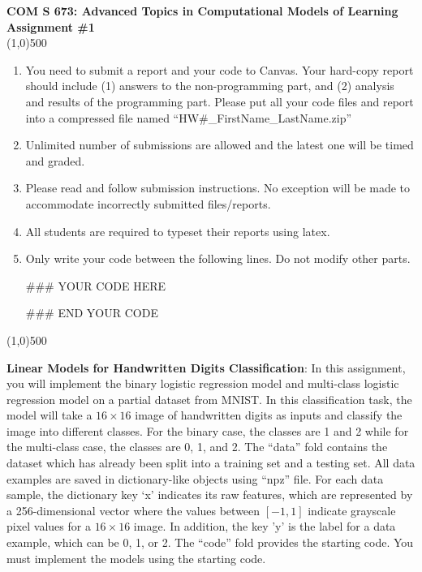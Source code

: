 \documentclass[11pt]{article}
\begin{document}
\begin{center}
{\Large \textbf{COM S 673: Advanced Topics in Computational Models of Learning\\
Assignment \#1}}\\
\linethickness{1mm}\line(1,0){500}\\
\begin{enumerate}
\item You need to submit a report and your code to
Canvas. Your hard-copy report should include (1) answers to the
non-programming part, and (2) analysis and results of the
programming part. Please put all your code files and report into a compressed file
named ``HW\#\_FirstName\_LastName.zip''
\item Unlimited number of submissions are allowed and the latest one will be timed and graded.
\item Please read and follow submission instructions. No exception will be made to accommodate incorrectly submitted files/reports.
\item All students are required to typeset their reports using latex.
\item Only write your code between the following lines. Do not modify other parts.

\#\#\# YOUR CODE HERE

\#\#\# END YOUR CODE
\end{enumerate}
\end{center}
\linethickness{1mm}\line(1,0){500}



\textbf{Linear Models for Handwritten Digits Classification}: In this assignment, you will implement the binary logistic regression model and multi-class logistic regression model on a partial dataset from MNIST. In this classification task, the model will take a $16 \times 16$ image of handwritten digits as inputs and classify the image into different classes. For the binary case, the classes are 1 and 2 while for the multi-class case, the classes are 0, 1,  and 2.
The ``data'' fold contains the dataset which has already been split into a training set and a testing set.  All data examples are saved in dictionary-like objects using ``npz'' file.  For each data sample, the dictionary key `x'  indicates its raw features, which are represented by a 256-dimensional vector where the values between $[-1, 1]$ indicate grayscale pixel values for a $16 \times 16$ image. In addition, the key 'y' is the label for a data example, which can be 0, 1, or 2.   The ``code'' fold provides the starting code. You must implement the models using the starting code.
\end{document}

